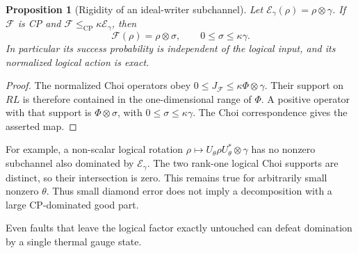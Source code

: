 \documentclass[11pt,reqno]{amsart}
\numberwithin{equation}{section}
\newtheorem{proposition}[theorem]{Proposition}
\theoremstyle{definition}
\theoremstyle{remark}
\newcommand{\Ecal}{\mathcal E}
\begin{document}
\begin{proposition}[Rigidity of an ideal-writer subchannel]\label{prop:rigidity}
Let \(\Ecal_\gamma(\rho)=\rho\otimes\gamma\).
If \(\mathcal F\) is CP and
\(\mathcal F\le_{\mathrm{CP}}\kappa\Ecal_\gamma\), then
\[
                  \mathcal F(\rho)=\rho\otimes\sigma,
                  \qquad 0\le\sigma\le\kappa\gamma.
\]
In particular its success probability is independent of the logical input,
and its normalized logical action is exact.
\end{proposition}
\begin{proof}
The normalized Choi operators obey
\(0\le J_{\mathcal F}\le\kappa\Phi\otimes\gamma\).
Their support on \(RL\) is therefore contained in the one-dimensional
range of \(\Phi\). A positive operator with that support is
\(\Phi\otimes\sigma\), with \(0\le\sigma\le\kappa\gamma\).
The Choi correspondence gives the asserted map.
\end{proof}

For example, a non-scalar logical rotation
\(\rho\mapsto U_\theta\rho U_\theta^*\otimes\gamma\)
has no nonzero subchannel also dominated by \(\Ecal_\gamma\).
The two rank-one logical Choi supports are distinct, so their intersection
is zero. This remains true for arbitrarily small nonzero \(\theta\).
Thus small diamond error does not imply a decomposition with a large
CP-dominated good part.

Even faults that leave the logical factor exactly untouched can defeat
domination by a single thermal gauge state.
\end{document}
